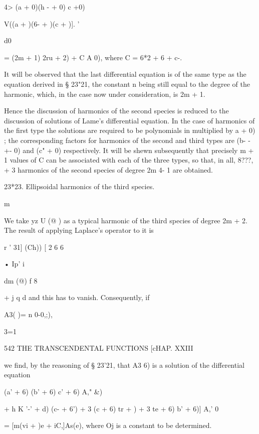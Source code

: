 {4>  (a  + 0)(h - + 0) c +0)   



V((a  +  )(6-  +  )(c + )]. '   



d0 

=  (2m + 1)  2ru + 2) + C  A  0), 
where C = 6*2 + 6  + c-. 

It will be observed that the last differential equation is of the same type 
as the equation derived in § 23"21, the constant n being still equal to the 
degree of the harmonic, which, in the case now under consideration, is 2m + 1. 

Hence the discussion of harmonics of the second species is reduced to 
the discussion of solutions of Lame's differential equation. In the case of 
harmonics of the first type the solutions are required to be polynomials in 
multiplied by \/ a  + 0) ; the corresponding factors for harmonics of the 
second and third types are \/(b- -+- 0) and  (c" + 0) respectively. It will be 
shewn subsequently that precisely m + 1 values of C can be associated with 
each of the three types, so that, in all, 8???, + 3 harmonics of the second species 
of degree 2m 4- 1 are obtained. 

23*23. Ellipsoidal harmonics of the third species. 

m 

We take yz U (@ ) as a typical harmonic of the third species of degree 
2m + 2. The result of applying Laplace's operator to it is 

r '  31] (Ch)) [ 2 6 6 

•  Ip' i  %

  dm (@) f 8  %

+ j q d%
and this has to vanish. Consequently, if 



A3( )= n 0-0,;), 

3=1 



542 THE TRANSCENDENTAL FUNCTIONS [cHAP. XXIII 

we find, by the reasoning of § 23'21, that A3  6) is a solution of the differential 
equation 

(a' + 6) (b' + 6)  c' + 6) A,"  \&) 

+ h K '-' + d) (c- + 6') + 3 (c  + 6)  tr +  ) + 3  te + 6) b' + 6)] A,'  0  

= [m(vi +  )e + iC,]As(e), 
where Oj is a constant to be determined. 

}

